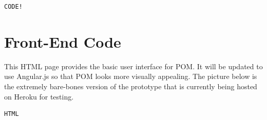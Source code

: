 \documentclass{report}
\begin{document}
\begin{lstlisting}
CODE!
\end{lstlisting}

\section{Front-End Code}

This HTML page provides the basic user interface for POM. It will be updated to use Angular.js so that POM looks more visually appealing. The picture below is the extremely bare-bones version of the prototype that is currently being hosted on Heroku for testing. 

\lstset{language=HTML}
\begin{lstlisting}
HTML
\end{lstlisting}




\end{document}
